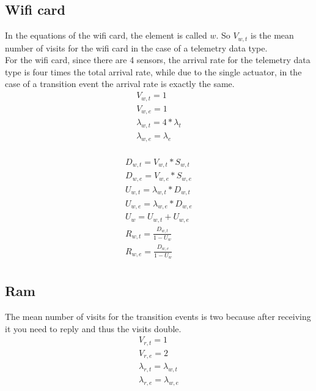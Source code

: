\documentclass[11pt]{article}
\begin{document}
\subsection{Wifi card}
In the equations of the wifi card, the element is called $w$. So $V_{w, t}$ is the mean number of visits for the wifi card in the case of a telemetry data type.\\
For the wifi card, since there are 4 sensors, the arrival rate for the telemetry data type is four times the total arrival rate, while due to the single actuator, in the case of a transition event the arrival rate is exactly the same.
\begin{equation}
    \begin{array}{l}
        V_{w, t} = 1 \\
        V_{w, e} = 1 \\
        \lambda_{w, t} = 4*\lambda_{t} \\ %
        \lambda_{w, e} = \lambda_{e} \\ %
    \end{array}
\end{equation}

\begin{equation}
    \begin{array}{l}
        D_{w, t} = V_{w, t} * S_{w, t} \\
        D_{w, e} = V_{w, e} * S_{w, e} \\
        U_{w, t} = \lambda_{w, t} * D_{w, t} \\
        U_{w, e} = \lambda_{w, e} * D_{w, e} \\
        U_{w} = U_{w, t} + U_{w, e} \\
        R_{w, t} = \frac{D_{w, t}}{1 - U_{w}} \\
        R_{w, e} = \frac{D_{w, e}}{1 - U_{w}} \\
    \end{array}
\end{equation}

\subsection{Ram}
The mean number of visits for the transition events is two because after receiving it you need to reply and thus the visits double.
\begin{equation}
    \begin{array}{l}
        V_{r, t} = 1 \\
        V_{r, e} = 2 \\ %
        \lambda_{r, t} = \lambda_{w, t} \\
        \lambda_{r, e} = \lambda_{w, e} \\
    \end{array}
\end{equation}
\end{document}
